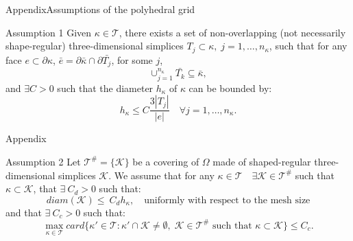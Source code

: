 \documentclass{beamer}
\begin{document}
\appendix
\begin{frame}[label=supplemental]{Appendix}{Assumptions of the polyhedral
grid}
	\begin{block}{Assumption 1}
		Given $\kappa \in \mathcal{T}$, there exists a set of non-overlapping
		(not
		necessarily shape-regular) three-dimensional simplices $T_j \subset
		\kappa,
		\; j = 1,\dots, n_\kappa$, such that for any face $e \subset \partial
		\kappa$, $\bar{e} = \partial \bar{\kappa} \cap \partial \bar{T_j}$, for
		some $j$,
		\begin{equation*}
		\cup_{j = 1}^{n_\kappa} \bar{T_k} \subseteq \bar{\kappa},
		\end{equation*}
		and  $\exists C > 0$ such that the diameter $h_\kappa$ of $\kappa$ can
		be bounded by:
		\begin{equation*}
		h_\kappa \leq C \frac{3 |T_j|}{|e|} \quad \forall j = 1,\dots,n_\kappa.
		\end{equation*}
	\end{block}
\end{frame}
\begin{frame}{Appendix}
	\begin{block}{Assumption 2}
		Let $\mathcal{T}^\# = \{ \mathcal{K} \}$ be a covering of $\Omega$ made
		of shaped-regular three-dimensional simplices $\mathcal{K}$. We assume
		that for any $\kappa\in\mathcal{T} \quad
		\exists\mathcal{K}\in\mathcal{T}^\#$
		such that $\kappa\subset\mathcal{K}$, that $\exists~C_d>0$ such that:
		\begin{equation*}
			diam(\mathcal{K})\leq~C_dh_\kappa, \quad \text{uniformly with
			respect to the mesh size}
		\end{equation*}
		and that $\exists~C_c>0$ such that:
		\begin{equation*}
			\max\limits_{\kappa \in \mathcal{T}} card \big\{ \kappa' \in
			\mathcal{T} : \kappa' \cap \mathcal{K} \ne \emptyset, \;
			\mathcal{K} \in \mathcal{T}^\# \text{ such that } \kappa \subset
			\mathcal{K} \big\} \leq C_c.
		\end{equation*}
	\end{block}
\end{frame}
\end{document}

